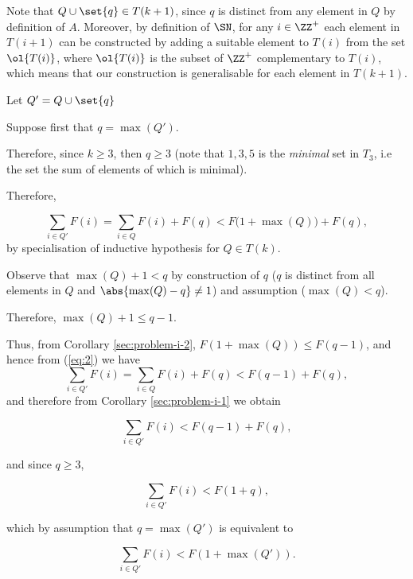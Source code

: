\documentclass[11pt, letterpaper]{scrartcl}
\begin{document}
\begin{soln}
\begin{description}
    Note that $Q\cup\set{q}\in T(k+1)$, since $q$ is distinct from any
    element in $Q$ by definition of $A$. Moreover, by definition of
    $\SN$, for any $i\in\ZZ^{+}$ each element in $T(i+1)$ can be
    constructed by adding a suitable element to $T(i)$ from the set
    $\ol{T(i)}$, where $\ol{T(i)}$ is the subset of $\ZZ^{+}$
    complementary to $T(i)$, which means that our construction is
    generalisable for each element in $T(k+1)$.

    Let $Q' = Q\cup\set{q}$

    Suppose first that $q = \max(Q')$.

    Therefore, since $k\geq 3$, then $q\geq 3$ (note that $1, 3, 5$ is the \textit{minimal} set in $T_3$, i.e the set the sum of elements of which is minimal).

    Therefore,

    \begin{equation}
      \label{eq:2}
      \sum_{i\in Q'} F(i) = \sum_{i\in Q}F(i) + F(q) < F\big(1+\max(Q)\big)+F(q),
    \end{equation}
    by specialisation of inductive hypothesis for $Q\in T(k)$.

    Observe that $\max(Q)+1 < q$ by construction of $q$ ($q$ is
    distinct from all elements in $Q$ and $\abs{\max(Q)-q} \neq 1$) and
    assumption ($\max(Q) < q$).

    Therefore, $\max(Q) +1 \leq q-1$.

    Thus, from Corollary \ref{sec:problem-i-2}, $F(1+\max(Q))\leq F(q-1)$, and
    hence from (\ref{eq:2}) we have
    \begin{equation}
      \sum_{i\in Q'} F(i) = \sum_{i\in Q}F(i) + F(q) < F(q-1)+F(q),
    \end{equation}
    and therefore from Corollary \ref{sec:problem-i-1} we obtain

    \begin{equation}
      \sum_{i\in Q'} F(i) < F(q-1)+F(q),
    \end{equation}

    and since $q\geq 3$,

    \begin{equation}
      \sum_{i\in Q'} F(i) < F(1+q),
    \end{equation}

    which by assumption that $q=\max(Q')$ is equivalent to

    \begin{equation}
      \sum_{i\in Q'} F(i) < F(1+\max(Q')).
    \end{equation}


\end{description}
\end{soln}
\end{document}
